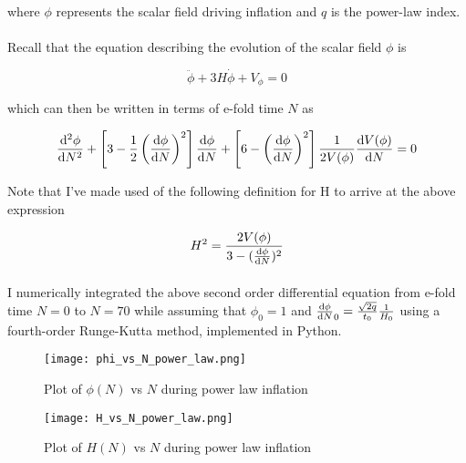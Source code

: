 \documentclass[12pt,a4paper,oneside]{book}
\begin{document}
\noindent where $\phi$ represents the scalar field driving inflation and $q$ is the power-law index.

\paragraph*{} Recall that the equation describing the evolution of the scalar field $\phi$ is

\begin{equation}
\ddot{\phi} + 3H\dot{\phi} + V_{\phi} = 0
\end{equation}

\noindent which can then be written in terms of e-fold time $N$ as

\begin{equation}
\frac{{\rm d}^2\phi}{{\rm d}N^2} + \left[3 - \frac{1}{2}\left(\frac{{\rm d}\phi}{{\rm d}N}\right)^2\right]\frac{{\rm d}\phi}{{\rm d}N} + \left[6 - \left(\frac{{\rm d}\phi}{{\rm d}N}\right)^2\right]\frac{1}{2V(\phi)}\frac{{\rm d}V(\phi)}{{\rm d}N} = 0
\end{equation}

\noindent Note that I've made used of the following definition for H to arrive at the above expression

\begin{equation}
H^2 = \frac{2V(\phi)}{3-(\frac{{\rm d}\phi}{{\rm d}N})^2}
\end{equation}

\paragraph*{} I numerically integrated the above second order differential equation from e-fold time $N = 0$ to $N = 70$ while assuming that $\phi_0 = 1$ and $\frac{{\rm d}\phi}{{\rm d}N}_0 = \frac{\sqrt{2q}}{t_0}\frac{1}{H_0}$ using a fourth-order Runge-Kutta method, implemented in Python.

\begin{figure}
\begin{center}
\texttt{[image: phi\_vs\_N\_power\_law.png]}
\caption[Plot of $\phi(N)$ vs $N$ during power law inflation]{Plot of $\phi(N)$ vs $N$ during power law inflation}
\end{center}
\end{figure}

\begin{figure}
\begin{center}
\texttt{[image: H\_vs\_N\_power\_law.png]}
\caption[Plot of $H(N)$ vs $N$ during power law inflation]{Plot of $H(N)$ vs $N$ during power law inflation}
\end{center}
\end{figure}
\end{document}
